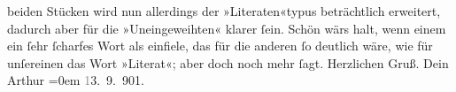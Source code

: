               beiden Stücken wird nun allerdings der »Literaten«typus beträchtlich erweitert,
               dadurch aber für die »Uneingeweihten« klarer ſein. Schön wärs halt, wenn einem ein
               ſehr ſcharfes Wort als \label{K_L01173_2v}\label{K_L01173_2h} einfiele, das für die anderen ſo deutlich wäre,
               wie für unſereinen das Wort »Literat«; aber doch noch mehr ſagt.\pend
           \pstart
           Herzlichen Gruß. Dein{\\[\baselineskip]}\spacefill\mbox{Arthur}\pend
           \leftskip=0em{}\pstart
           \textcolor{gray}{1}3. 9. 901.\pend
           \endnumbering{}  
      